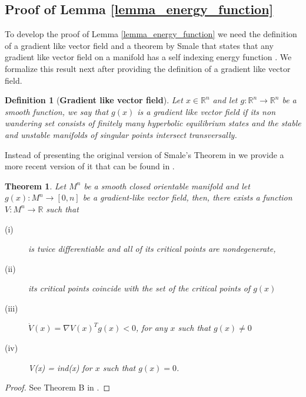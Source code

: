 \documentclass[article]{IEEEtran}
\newtheorem{theorem}{Theorem}
\newtheorem{definition}{Definition}
\theoremstyle{definition}
\begin{document}

\subsection{Proof of Lemma \ref{lemma_energy_function}}\label{ap_energy_function}
To develop the proof of Lemma \ref{lemma_energy_function} we need the definition of a gradient like vector field and a theorem by Smale that states that any gradient like vector field on a manifold has a self indexing energy function \cite{10.2307/1970311}. We formalize this result next after providing the definition of a gradient like vector field.
%
\begin{definition}[\bf Gradient like vector field]\label{def_gradient_like_field}
Let $x \in \mathbb{R}^n$ and let $g : \mathbb{R}^n \to \mathbb{R}^n$ be a smooth function, we say that $g(x)$ is a gradient like vector field if its non wandering set consists of finitely many hyperbolic equilibrium states and the stable and unstable manifolds of singular points intersect transversally. 
\end{definition}
% 
Instead of presenting the original version of Smale's Theorem in \cite{10.2307/1970311} we provide a more recent version of it that can be found in \cite{grines2014energy}.
%
\begin{theorem}\label{theo_energy_function_smale}
Let $M^n$ be a smooth closed orientable manifold and let $g(x): M^n \to [0,n]$ be a gradient-like vector field, then, there exists a function $V: M^n \to \mathbb{R}$ such that 
%
\begin{description}
\item[(i)] is twice differentiable and all of its critical points are nondegenerate,
\item[(ii)] its critical points coincide with the set of the critical points of $g(x)$
\item[(iii)] $\dot{V}(x) = \nabla V(x)^T g(x) < 0$, for any $x$ such that $g(x) \neq 0$
\item[(iv)] V(x) = ind(x) for $x$ such that $ g(x) =0$.
\end{description}
%
\end{theorem}
\begin{proof}
See Theorem B in \cite{10.2307/1970311}.
\end{proof}
\end{document}
